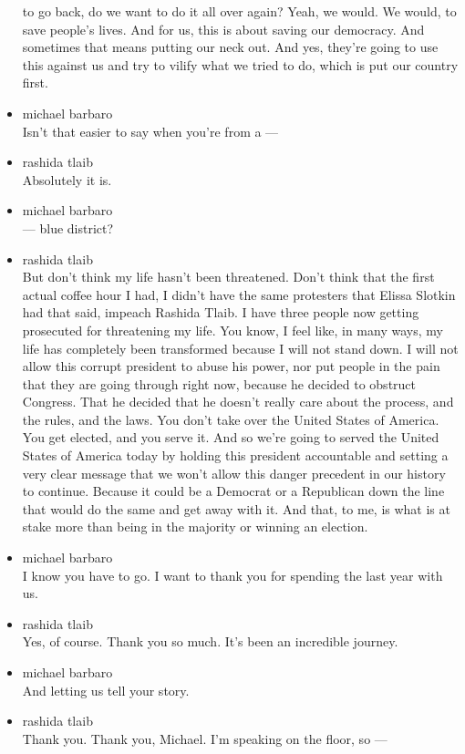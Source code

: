 \begin{itemize}
  to go back, do we want to do it all over again? Yeah, we would. We
  would, to save people's lives. And for us, this is about saving our
  democracy. And sometimes that means putting our neck out. And yes,
  they're going to use this against us and try to vilify what we tried
  to do, which is put our country first.
\item
  michael barbaro\\
  Isn't that easier to say when you're from a ---
\item
  rashida tlaib\\
  Absolutely it is.
\item
  michael barbaro\\
  --- blue district?
\item
  rashida tlaib\\
  But don't think my life hasn't been threatened. Don't think that the
  first actual coffee hour I had, I didn't have the same protesters that
  Elissa Slotkin had that said, impeach Rashida Tlaib. I have three
  people now getting prosecuted for threatening my life. You know, I
  feel like, in many ways, my life has completely been transformed
  because I will not stand down. I will not allow this corrupt president
  to abuse his power, nor put people in the pain that they are going
  through right now, because he decided to obstruct Congress. That he
  decided that he doesn't really care about the process, and the rules,
  and the laws. You don't take over the United States of America. You
  get elected, and you serve it. And so we're going to served the United
  States of America today by holding this president accountable and
  setting a very clear message that we won't allow this danger precedent
  in our history to continue. Because it could be a Democrat or a
  Republican down the line that would do the same and get away with it.
  And that, to me, is what is at stake more than being in the majority
  or winning an election.
\item
  michael barbaro\\
  I know you have to go. I want to thank you for spending the last year
  with us.
\item
  rashida tlaib\\
  Yes, of course. Thank you so much. It's been an incredible journey.
\item
  michael barbaro\\
  And letting us tell your story.
\item
  rashida tlaib\\
  Thank you. Thank you, Michael. I'm speaking on the floor, so ---

\end{itemize}
